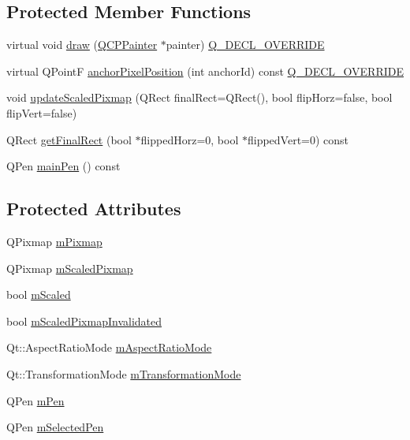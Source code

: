 \subsection*{Protected Member Functions}
\begin{DoxyCompactItemize}
\item 
virtual void \hyperlink{class_q_c_p_item_pixmap_a9538a7d37fe20a4ff4bb2cb5bbbf2b48}{draw} (\hyperlink{class_q_c_p_painter}{Q\+C\+P\+Painter} $\ast$painter) \hyperlink{qcustomplot_8h_a42cc5eaeb25b85f8b52d2a4b94c56f55}{Q\+\_\+\+D\+E\+C\+L\+\_\+\+O\+V\+E\+R\+R\+I\+DE}
\item 
virtual Q\+PointF \hyperlink{class_q_c_p_item_pixmap_a5803d8e173bc4d48619fc43701db32e5}{anchor\+Pixel\+Position} (int anchor\+Id) const \hyperlink{qcustomplot_8h_a42cc5eaeb25b85f8b52d2a4b94c56f55}{Q\+\_\+\+D\+E\+C\+L\+\_\+\+O\+V\+E\+R\+R\+I\+DE}
\item 
void \hyperlink{class_q_c_p_item_pixmap_a8bced3027b326b290726cd1979c7cfc6}{update\+Scaled\+Pixmap} (Q\+Rect final\+Rect=Q\+Rect(), bool flip\+Horz=false, bool flip\+Vert=false)
\item 
Q\+Rect \hyperlink{class_q_c_p_item_pixmap_a4e7d803e5093c457a109f8fae56677c2}{get\+Final\+Rect} (bool $\ast$flipped\+Horz=0, bool $\ast$flipped\+Vert=0) const
\item 
Q\+Pen \hyperlink{class_q_c_p_item_pixmap_aad6dddd67163831538d40023a98a9fe7}{main\+Pen} () const
\end{DoxyCompactItemize}
\subsection*{Protected Attributes}
\begin{DoxyCompactItemize}
\item 
Q\+Pixmap \hyperlink{class_q_c_p_item_pixmap_a1396cce7f26c7b8e9512906284380c4d}{m\+Pixmap}
\item 
Q\+Pixmap \hyperlink{class_q_c_p_item_pixmap_a2ebc66e15b9f1264563d58f29ba1bc00}{m\+Scaled\+Pixmap}
\item 
bool \hyperlink{class_q_c_p_item_pixmap_a8fe670a529cd46a9b8afd9fc1203bc3f}{m\+Scaled}
\item 
bool \hyperlink{class_q_c_p_item_pixmap_a223134abd4cf3d6c368573c622bd2e1c}{m\+Scaled\+Pixmap\+Invalidated}
\item 
Qt\+::\+Aspect\+Ratio\+Mode \hyperlink{class_q_c_p_item_pixmap_a8dc6b6c1e106ac523efae22d5fe55bab}{m\+Aspect\+Ratio\+Mode}
\item 
Qt\+::\+Transformation\+Mode \hyperlink{class_q_c_p_item_pixmap_ac9ecad3b9842363754e32eda2cf821bd}{m\+Transformation\+Mode}
\item 
Q\+Pen \hyperlink{class_q_c_p_item_pixmap_acfee1124eb51a1887aaf8de10777c7a1}{m\+Pen}
\item 
Q\+Pen \hyperlink{class_q_c_p_item_pixmap_a0949e5bb6a261fc4e9668e28e2effcfa}{m\+Selected\+Pen}
\end{DoxyCompactItemize}
